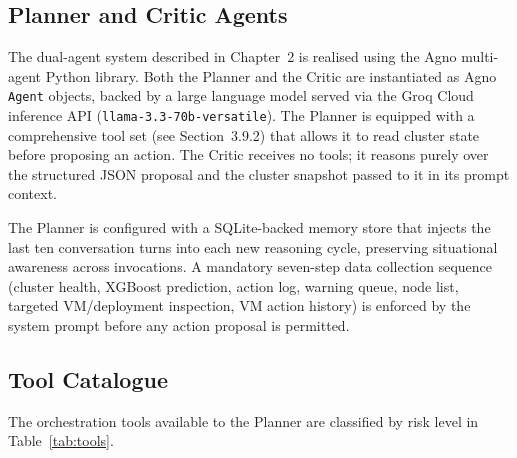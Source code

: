 \documentclass[12pt,a4paper]{report}
\begin{document}
\subsection{Planner and Critic Agents}

The dual-agent system described in Chapter~2 is realised using the Agno
multi-agent Python library. Both the Planner and the Critic are instantiated as
Agno \texttt{Agent} objects, backed by a large language model served via the Groq
Cloud inference API (\texttt{llama-3.3-70b-versatile}). The Planner is equipped
with a comprehensive tool set (see Section~3.9.2) that allows it to read cluster
state before proposing an action. The Critic receives no tools; it reasons purely
over the structured JSON proposal and the cluster snapshot passed to it in its
prompt context.

The Planner is configured with a SQLite-backed memory store that injects the last
ten conversation turns into each new reasoning cycle, preserving situational
awareness across invocations. A mandatory seven-step data collection sequence
(cluster health, XGBoost prediction, action log, warning queue, node list, targeted
VM/deployment inspection, VM action history) is enforced by the system prompt
before any action proposal is permitted.

\subsection{Tool Catalogue}

The orchestration tools available to the Planner are classified by risk level in
Table~\ref{tab:tools}.
\end{document}
